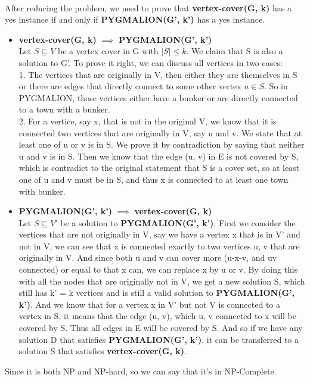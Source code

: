 \documentclass[a4paper]{article}
\begin{document}
\\
After reducing the problem, we need to prove that \textbf{vertex-cover(G, k)} has a yes instance if and only if
\textbf{PYGMALION(G', k')} has a yes instance. \\
\begin{itemize}
 	\item \textbf{vertex-cover(G, k)} $\implies$ \textbf{PYGMALION(G', k')} \\
		Let $S \subseteq V$ be a vertex cover in G with $|S| \leq k$. We claim
		that S is also a solution to G'.
		To prove it right, we can discuss all vertices in two cases: \\
		1. The vertices that are originally in V, then either they are themselves
		in S or there are edges that directly connect to some other vertex $u \in S$.
		So in PYGMALION, those vertices either have a bunker or are directly connected
		to a town with a bunker. \\
		2. For a vertice, say x, that is not in the original V, we know that it
		is connected two vertices that are originally in V, say u and v. We state
		that at least one of u or v is in S. We prove it by contradiction by saying
		that neither u and v is in S. Then we know that the edge (u, v) in E is not
		covered by S, which is contradict to the original statement that S is a
		cover set, so at least one of u and v must be in S, and thus x is connected
		to at least one town with bunker.
	\item \textbf{PYGMALION(G', k')} $\implies$ \textbf{vertex-cover(G, k)} \\
		Let $S \subseteq V'$ be a solution to \textbf{PYGMALION(G', k')}. First
		we consider the vertices that are not originally in V, say we have a vertex
		x that is in V' and not in V, we can see that x is connected exactly to two
		vertices u, v that are originally in V. And since both u and v can cover more
		(u-x-v, and uv connected) or equal to that x can, we can replace x by u or v.
		By doing this with all the nodes that are originally not in V, we get a new solution
		S, which still has k' = k vertices and is still a valid solution to
		\textbf{PYGMALION(G', k')}. And we know that for a vertex x in V' but not V
		is connected to a vertex in S, it means that the edge (u, v), which u, v connected to x
		will be covered by S. Thus all edges in E will be covered by S. And so if we have
		any solution D that satisfies \textbf{PYGMALION(G', k')}, it can be transferred to
		a solution S that satisfies \textbf{vertex-cover(G, k)}.
\end{itemize}

Since it is both NP and NP-hard, so we can say that it's in NP-Complete.
\end{document}
